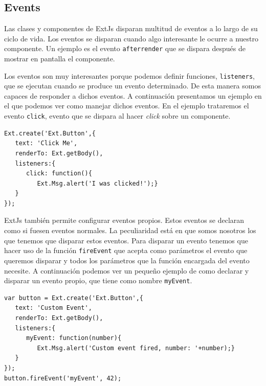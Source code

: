 	\subsection{Events}
		Las clases y componentes de ExtJs disparan multitud de eventos a lo largo de su ciclo de vida. Los eventos se disparan cuando algo
		interesante le ocurre a nuestro componente. Un ejemplo es el evento \texttt{afterrender} que se dispara después de mostrar en pantalla
		el componente.
		\par
		Los eventos son muy interesantes porque podemos definir funciones, \texttt{listeners}, que se ejecutan cuando se produce un evento
		determinado. De esta manera somos capaces de responder a dichos eventos. A continuación presentamos un ejemplo en el que podemos ver
		como manejar dichos eventos. En el ejemplo trataremos el evento \texttt{click}, evento que se dispara al hacer \emph{click} sobre un
		componente. 
		\begin{lstlisting}[style=myJs]
Ext.create('Ext.Button',{
   text: 'Click Me',
   renderTo: Ext.getBody(),
   listeners:{
      click: function(){
         Ext.Msg.alert('I was clicked!');}
   }
});
		\end{lstlisting}
		\par
		ExtJs también permite configurar eventos propios. Estos eventos se declaran como si fuesen eventos normales. La peculiaridad está
		en que somos nosotros los que tenemos que disparar estos eventos. Para disparar un evento tenemos que hacer uso de la función
		\texttt{fireEvent} que acepta como parámetros el evento que queremos disparar y todos los parámetros que la función encargada del
		evento necesite. A continuación podemos ver un pequeño ejemplo de como declarar y disparar un evento propio, que tiene como nombre
		\texttt{myEvent}.
		\begin{lstlisting}[style=myJs]
var button = Ext.create('Ext.Button',{
   text: 'Custom Event',
   renderTo: Ext.getBody(),
   listeners:{
      myEvent: function(number){
         Ext.Msg.alert('Custom event fired, number: '+number);}
   }
});
button.fireEvent('myEvent', 42);
		\end{lstlisting}
